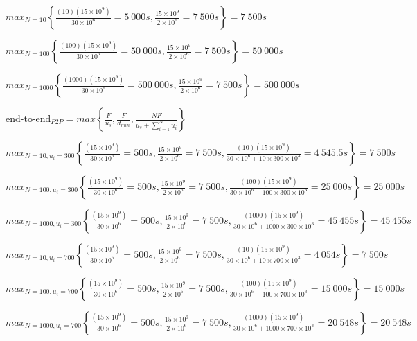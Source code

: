 \documentclass{article}
\begin{document}
\begin{enumerate}
\hspace*{20mm}$max_{N=10}\left\{ \frac{(10)(15\times 10^9)}{30\times 10^6}=5\ 000s,\frac{15\times 10^9}{2\times 10^6}=7\ 500s\right\}=7\ 500s$\par
\hspace*{18.5mm}$max_{N=100}\left\{ \frac{(100)(15\times 10^9)}{30\times 10^6}=50\ 000s,\frac{15\times 10^9}{2\times 10^6}=7\ 500s\right\}=50\ 000s$\par
\hspace*{17mm}$max_{N=1000}\left\{ \frac{(1000)(15\times 10^9)}{30\times 10^6}=500\ 000s,\frac{15\times 10^9}{2\times 10^6}=7\ 500s\right\}=500\ 000s$\par
\vspace*{5mm}
end-to-end$_{P2P}=max\left\{ \frac{F}{u_s},\frac{F}{d_{min}},\frac{NF}{u_s+\sum_{i=1}^N u_i}\right\}$\par

\hspace*{9.5mm}$max_{N=10, u_i=300}\left\{ \frac{(15\times 10^9)}{30\times 10^6}=500s,\frac{15\times 10^9}{2\times 10^6}=7\ 500s, \frac{(10)(15\times 10^9)}{30\times 10^6+10\times 300\times 10^3}=4\ 545.5s\right\}=7\ 500s$\par
\hspace*{8mm}$max_{N=100, u_i=300}\left\{ \frac{(15\times 10^9)}{30\times 10^6}=500s,\frac{15\times 10^9}{2\times 10^6}=7\ 500s, \frac{(100)(15\times 10^9)}{30\times 10^6+100\times 300\times 10^3}=25\ 000s\right\}=25\ 000s$\par
\hspace*{6.5mm}$max_{N=1000, u_i=300}\left\{ \frac{(15\times 10^9)}{30\times 10^6}=500s,\frac{15\times 10^9}{2\times 10^6}=7\ 500s, \frac{(1000)(15\times 10^9)}{30\times 10^6+1000\times 300\times 10^3}=45\ 455s\right\}=45\ 455s$\par

\hspace*{9.5mm}$max_{N=10, u_i=700}\left\{ \frac{(15\times 10^9)}{30\times 10^6}=500s,\frac{15\times 10^9}{2\times 10^6}=7\ 500s, \frac{(10)(15\times 10^9)}{30\times 10^6+10\times 700\times 10^3}=4\ 054s\right\}=7\ 500s$\par
\hspace*{8mm}$max_{N=100, u_i=700}\left\{ \frac{(15\times 10^9)}{30\times 10^6}=500s,\frac{15\times 10^9}{2\times 10^6}=7\ 500s, \frac{(100)(15\times 10^9)}{30\times 10^6+100\times 700\times 10^3}=15\ 000s\right\}=15\ 000s$\par
\hspace*{6.5mm}$max_{N=1000, u_i=700}\left\{ \frac{(15\times 10^9)}{30\times 10^6}=500s,\frac{15\times 10^9}{2\times 10^6}=7\ 500s, \frac{(1000)(15\times 10^9)}{30\times 10^6+1000\times 700\times 10^3}=20\ 548s\right\}=20\ 548s$\par


\end{enumerate}
\end{document}
